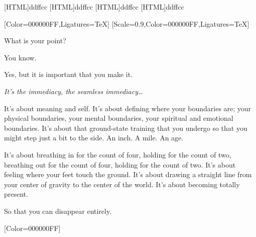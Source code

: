[HTML]{ddffcc}
[HTML]{ddffcc}
[HTML]{ddffcc}
[HTML]{ddffcc}
\begin{paracol}{2}
  \begin{leftcolumn}
[Color=000000FF,Ligatures=TeX]
\renewfontfamily{}[Scale=0.9,Color=000000FF,Ligatures=TeX]

\begin{ally}
What is your point?
\end{ally}
You know.

\begin{ally}
Yes, but it is important that you make it.
\end{ally}
\emph{It's the immediacy, the seamless immediacy\ldots{}}

It's about meaning and self. It's about defining where your boundaries are; your physical boundaries, your mental boundaries, your spiritual and emotional boundaries. It's about that ground-state training that you undergo so that you might step just a bit to the side. An inch. A mile. An age.

It's about breathing in for the count of four, holding for the count of two, breathing out for the count of four, holding for the count of two. It's about feeling where your feet touch the ground. It's about drawing a straight line from your center of gravity to the center of the world. It's about becoming totally present.

\begin{ally}
So that you can disappear entirely.
\end{ally}
\newpage
\end{leftcolumn}
\end{paracol}


\renewfontfamily{}[Color=000000FF]

